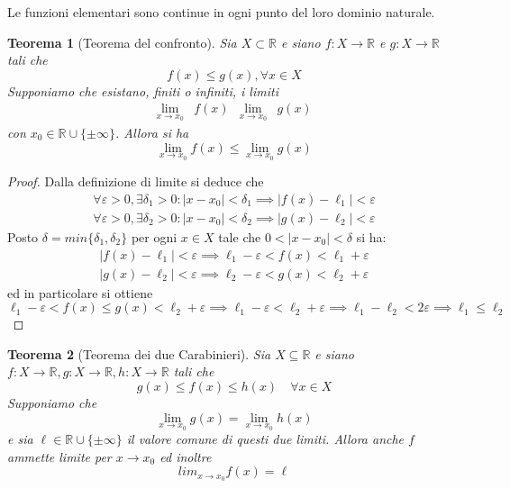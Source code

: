 \documentclass[11pt]{book}
\newtheorem{theorem}{Teorema}[chapter]
\begin{document}
Le funzioni elementari sono continue in ogni punto del loro dominio naturale.
\begin{theorem}[Teorema del confronto]
    Sia $X\subset\mathbb{R}$ e siano $f:X\rightarrow\mathbb{R}$ e $g:X\rightarrow\mathbb{R}$ tali che 
    \begin{equation*}
        f(x)\leq g(x), \forall x\in X
    \end{equation*}
    Supponiamo che esistano, finiti o infiniti, i limiti
    \begin{align*}
        \lim_{x\rightarrow x_0}&f(x) & \lim_{x\rightarrow x_0}&g(x)
    \end{align*}
    con $x_0\in\mathbb{R}\cup\{\pm\infty\}$. Allora si ha 
    \begin{equation*}
        \lim_{x\rightarrow x_0}f(x)\leq\lim_{x\rightarrow x_0}g(x)
    \end{equation*}
\end{theorem}
\begin{proof}
    Dalla definizione di limite si deduce che 
    \begin{align*}
        \forall\varepsilon>0,\exists\delta_1>0:|x-x_0|<\delta_1\implies|f(x)-\ell_1|<\varepsilon\\
        \forall\varepsilon>0,\exists\delta_2>0:|x-x_0|<\delta_2\implies|g(x)-\ell_2|<\varepsilon
    \end{align*}
    Posto $\delta=min\{\delta_1,\delta_2\}$ per ogni $x\in X$ tale che $0<|x-x_0|<\delta$ si ha:
    \begin{align*}
        |f(x)-\ell_1|<\varepsilon\implies \ell_1-\varepsilon<f(x)<\ell_1+\varepsilon\\
        |g(x)-\ell_2|<\varepsilon\implies \ell_2-\varepsilon<g(x)<\ell_2+\varepsilon
    \end{align*}
    ed in particolare si ottiene
    \begin{equation*}
        \ell_1-\varepsilon<f(x)\leq g(x)<\ell_2+\varepsilon\implies\ell_1-\varepsilon<\ell_2+\varepsilon\implies\ell_1-\ell_2<2\varepsilon\implies\ell_1\leq\ell_2
    \end{equation*}
\end{proof}
\begin{theorem}[Teorema dei due Carabinieri]
    Sia $X\subseteq\mathbb{R}$ e siano $f:X\rightarrow\mathbb{R},g:X\rightarrow\mathbb{R},h:X\rightarrow\mathbb{R}$ tali 
    che 
    \begin{equation*}
        g(x)\leq f(x)\leq h(x)\quad\forall x\in X
    \end{equation*}
    Supponiamo che 
    \begin{equation*}
        \lim_{x\rightarrow x_0}g(x)=\lim_{x\rightarrow x_0}h(x)
    \end{equation*}
    e sia $\ell\in\mathbb{R}\cup\{\pm\infty\}$ il valore comune di questi due limiti. Allora anche $f$ ammette limite 
    per $x\rightarrow x_0$ ed inoltre
    \begin{equation*}
        lim_{x\rightarrow x_0}f(x)=\ell
    \end{equation*}
\end{theorem}
\end{document}
